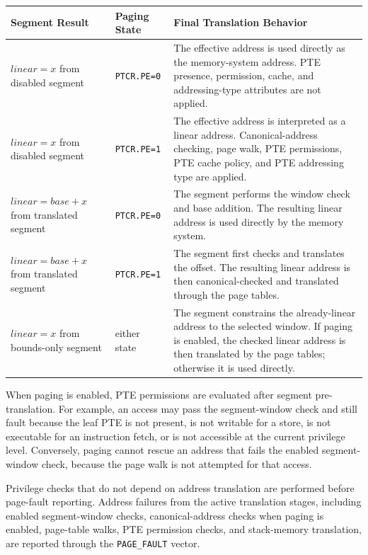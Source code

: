 \begingroup\footnotesize
\begin{longtable}{@{}p{1.15in}p{1.05in}p{3.25in}@{}}
\toprule
\textbf{Segment Result} & \textbf{Paging State} & \textbf{Final Translation Behavior}\\
\midrule
\endhead
\(\mathit{linear}=x\) from disabled segment & \texttt{PTCR.PE=0} & The effective address is used directly as the memory-system address. PTE presence, permission, cache, and addressing-type attributes are not applied.\\
\(\mathit{linear}=x\) from disabled segment & \texttt{PTCR.PE=1} & The effective address is interpreted as a linear address. Canonical-address checking, page walk, PTE permissions, PTE cache policy, and PTE addressing type are applied.\\
\(\mathit{linear}=\mathit{base}+x\) from translated segment & \texttt{PTCR.PE=0} & The segment performs the window check and base addition. The resulting linear address is used directly by the memory system.\\
\(\mathit{linear}=\mathit{base}+x\) from translated segment & \texttt{PTCR.PE=1} & The segment first checks and translates the offset. The resulting linear address is then canonical-checked and translated through the page tables.\\
\(\mathit{linear}=x\) from bounds-only segment & either state & The segment constrains the already-linear address to the selected window. If paging is enabled, the checked linear address is then translated by the page tables; otherwise it is used directly.\\
\bottomrule
\end{longtable}
\endgroup

When paging is enabled, PTE permissions are evaluated after segment pre-translation.
For example, an access may pass the segment-window check and still fault because the
leaf PTE is not present, is not writable for a store, is not executable for an instruction
fetch, or is not accessible at the current privilege level. Conversely, paging cannot
rescue an address that fails the enabled segment-window check, because the page walk is
not attempted for that access.

Privilege checks that do not depend on address translation are performed before page-fault
reporting. Address failures from the active translation stages, including enabled
segment-window checks, canonical-address checks when paging is enabled, page-table walks,
PTE permission checks, and stack-memory translation, are reported through the
\texttt{PAGE\_FAULT} vector.


